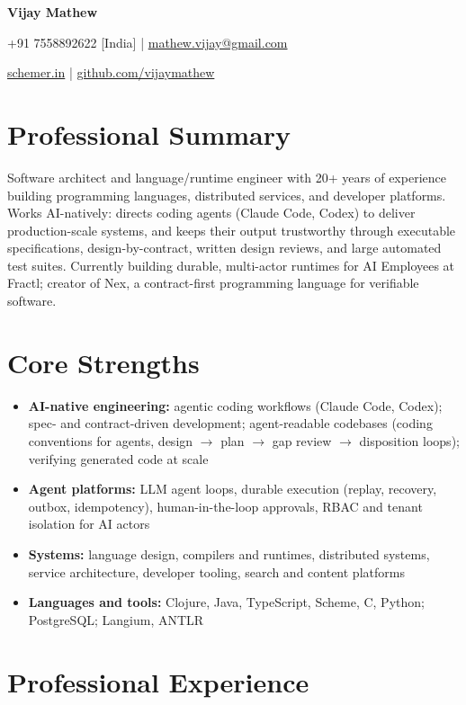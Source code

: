 \documentclass[10pt,letterpaper]{article}
\newcommand{\resumeheader}[1]{{\fontsize{20}{24}\selectfont\bfseries\color{heading} #1}}
\newcommand{\contact}[1]{{\small\color{muted} #1}}
\begin{document}
\color{textbody}

\resumeheader{Vijay Mathew}

\vspace{0.25em}
\contact{+91 7558892622 [India] \quad | \quad \href{mailto:mathew.vijay@gmail.com}{mathew.vijay@gmail.com}}

\contact{\href{http://schemer.in}{schemer.in} \quad | \quad \href{https://github.com/vijaymathew/}{github.com/vijaymathew}}

\section*{Professional Summary}
Software architect and language/runtime engineer with 20+ years of experience building programming languages, distributed services, and developer platforms. Works AI-natively: directs coding agents (Claude Code, Codex) to deliver production-scale systems, and keeps their output trustworthy through executable specifications, design-by-contract, written design reviews, and large automated test suites. Currently building durable, multi-actor runtimes for AI Employees at Fractl; creator of Nex, a contract-first programming language for verifiable software.

\section*{Core Strengths}
\begin{itemize}
  \item \textbf{AI-native engineering:} agentic coding workflows (Claude Code, Codex); spec- and contract-driven development; agent-readable codebases (coding conventions for agents, design $\rightarrow$ plan $\rightarrow$ gap review $\rightarrow$ disposition loops); verifying generated code at scale
  \item \textbf{Agent platforms:} LLM agent loops, durable execution (replay, recovery, outbox, idempotency), human-in-the-loop approvals, RBAC and tenant isolation for AI actors
  \item \textbf{Systems:} language design, compilers and runtimes, distributed systems, service architecture, developer tooling, search and content platforms
  \item \textbf{Languages and tools:} Clojure, Java, TypeScript, Scheme, C, Python; PostgreSQL; Langium, ANTLR
\end{itemize}

\section*{Professional Experience}
\end{document}

